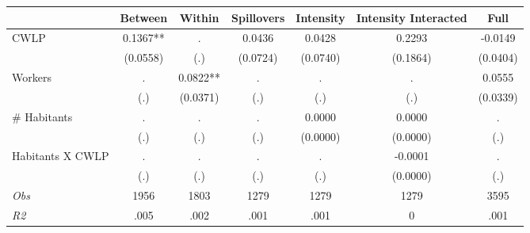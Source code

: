 \begin{tabular}{l*{6}{c}}\hline&\multicolumn{1}{c}{Between}&\multicolumn{1}{c}{Within}&\multicolumn{1}{c}{Spillovers}&\multicolumn{1}{c}{Intensity}&\multicolumn{1}{c}{Intensity Interacted}&\multicolumn{1}{c}{Full}\\ \hline 
CWLP & 0.1367** & . & 0.0436 & 0.0428 & 0.2293 & -0.0149 \\
 & (0.0558) & (.) & (0.0724) & (0.0740) & (0.1864) & (0.0404) \\
Workers & . & 0.0822** & . & . & . & 0.0555 \\
 & (.) & (0.0371) & (.) & (.) & (.) & (0.0339) \\
\# Habitants & . & . & . & 0.0000 & 0.0000 & . \\
 & (.) & (.) & (.) & (0.0000) & (0.0000) & (.) \\
Habitants X CWLP & . & . & . & . & -0.0001 & . \\
 & (.) & (.) & (.) & (.) & (0.0000) & (.) \\
\hline \textit{Obs} & 1956 & 1803 & 1279 & 1279 & 1279 & 3595 \\ \textit{R2} & .005 & .002 & .001 & .001 & 0 & .001 \\ \hline \end{tabular}
